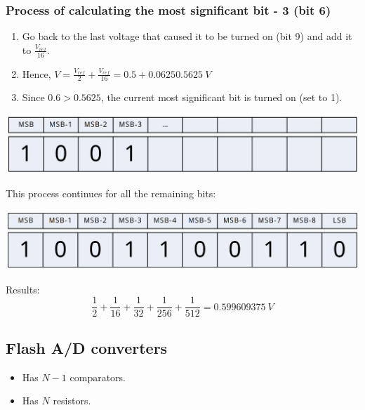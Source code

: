 \documentclass[11pt]{article}
\begin{document}
\subsubsection{Process of calculating the most significant bit - 3 (bit 6)}
\label{sec:orgb08f292}
\begin{enumerate}
\item Go back to the last voltage that caused it to be turned on (bit 9) and add it to \(\frac{V_{ref}}{16}\).
\item Hence, \(V = \frac{V_{ref}}{2} + \frac{V_{ref}}{16} = 0.5 + 0.0625 \qty{0.5625}{V}\)
\item Since \(0.6 > 0.5625\), the current most significant bit is turned on (set to 1).
\end{enumerate}

\begin{center}
\includegraphics[width=.9\linewidth]{./images/a-d-converter-msb-3-calculation-process.png}
\end{center}

This process continues for all the remaining bits:
\begin{center}
\includegraphics[width=.9\linewidth]{./images/a-d-converter-calculation-process-result.png}
\end{center}

Results:
\[\frac{1}{2} + \frac{1}{16} + \frac{1}{32} + \frac{1}{256} + \frac{1}{512} = \qty{0.599609375}{V}\]
\subsection{Flash A/D converters}
\label{sec:org42e20ff}
\begin{itemize}
\item Has \(N - 1\) comparators.
\item Has \(N\) resistors.
\end{itemize}
\end{document}
